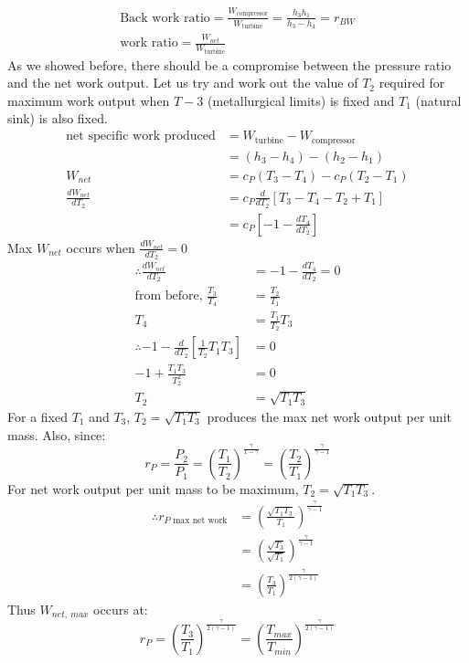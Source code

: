 \documentclass[class=report, crop=false, 12pt,a4paper]{standalone}
\begin{document}
\begin{gather}
  \textrm{Back work ratio} = \frac{W_{\textrm{compressor}}}{W_{\textrm{turbine}}} = \frac{h_3 h_1}{h_3 - h_4} = r_{BW}\\
  \textrm{work ratio} = \frac{W_{net}}{W_{\textrm{turbine}}}
\end{gather}
As we showed before, there should be a compromise between the pressure ratio and the net work output. Let us try and work out the value of $T_2$ required for maximum work output when $T-3$ (metallurgical limits) is fixed and $T_1$ (natural sink) is also fixed. 
\begin{align}
  \textrm{net specific work produced} &= W_{\textrm{turbine}} - W_{\textrm{compressor}}\\
  &= (h_3 - h_4) - (h_2 - h_1)\\
  W_{net} &= c_P (T_3 - T_4) - c_P (T_2 - T_1)\\
  \frac{dW_{net}}{dT_2} &= c_P \frac{d}{dT_2} \left[ T_3 - T_4 - T_2 + T_1 \right]\\
  &= c_P \left[ -1 - \frac{dT_4}{dT_2} \right]
\end{align}
Max $W_{net}$ occurs when $\frac{dW_{net}}{dT_2} = 0$
\begin{align}
  \therefore \frac{dW_{net}}{dT_2} &= -1 - \frac{dT_4}{dT_2} = 0\\
  \textrm{from before, } \frac{T_3}{T_4} &= \frac{T_2}{T_1}\\
  T_4 &= \frac{T_1}{T_2}T_3\\
  \therefore -1 - \frac{d}{dT_2} \left[ \frac{1}{T_2} T_1 T_3 \right] &= 0\\
  -1 + \frac{T_1 T_3}{T_2^2} &= 0\\
  T_2 &= \sqrt{T_1 T_3}
\end{align}
For a fixed $T_1$ and $T_3$, $T_2 = \sqrt{T_1 T_3}$ produces the max net work output per unit mass. Also, since:
\begin{equation}
  r_P = \frac{P_2}{P_1} = \left( \frac{T_1}{T_2} \right)^{\frac{\gamma}{1- \gamma}} = \left( \frac{T_2}{T_1} \right)^{\frac{\gamma}{\gamma -1}} 
\end{equation}
For net work output per unit mass to be maximum, $T_2 = \sqrt{T_1 T_3}$. 
\begin{align}
  \therefore r_{P \textrm{ max net work}} &= \left( \frac{\sqrt{T_1 T_3}}{T_1} \right)^{\frac{\gamma}{\gamma -1}}\\
  &= \left( \frac{\sqrt{T_3}}{\sqrt{T_1}} \right)^{\frac{\gamma}{\gamma -1}}\\
  &= \left( \frac{T_3}{T_1} \right)^{\frac{\gamma}{2(\gamma -1)}}
\end{align}
Thus $W_{net, \ max}$ occurs at:
\begin{equation}
  r_P = \left( \frac{T_3}{T_1} \right)^{\frac{\gamma}{2(\gamma -1)}} = \left( \frac{T_{max}}{T_{min}} \right)^{\frac{\gamma}{2(\gamma -1)}}
\end{equation}
\end{document}
